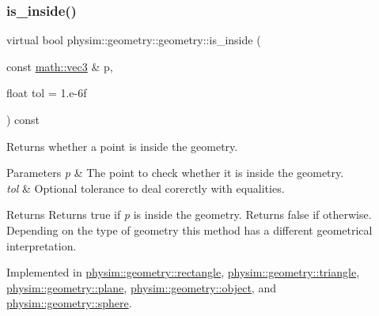 \mbox{\label{classphysim_1_1geometry_1_1geometry_a8ae67bba78a06e3c41b7f5b5903b897d}} 
\subsubsection{\texorpdfstring{is\+\_\+inside()}{is\_inside()}}
{\footnotesize\ttfamily virtual bool physim\+::geometry\+::geometry\+::is\+\_\+inside (\begin{DoxyParamCaption}\item[{const \hyperlink{structphysim_1_1math_1_1vec3}{math\+::vec3} \&}]{p,  }\item[{float}]{tol = {\ttfamily 1.e-\/6f} }\end{DoxyParamCaption}) const\hspace{0.3cm}{\ttfamily [pure virtual]}}



Returns whether a point is inside the geometry. 


\begin{DoxyParams}{Parameters}
{\em p} & The point to check whether it is inside the geometry. \\
\hline
{\em tol} & Optional tolerance to deal corerctly with equalities. \\
\hline
\end{DoxyParams}
\begin{DoxyReturn}{Returns}
Returns true if {\itshape p} is inside the geometry. Returns false if otherwise. Depending on the type of geometry this method has a different geometrical interpretation. 
\end{DoxyReturn}


Implemented in \hyperlink{classphysim_1_1geometry_1_1rectangle_ab3e8fe39d7d8fa8139bae3f84b41127c}{physim\+::geometry\+::rectangle}, \hyperlink{classphysim_1_1geometry_1_1triangle_aa63eb64a152db96607423c9c30e5dd01}{physim\+::geometry\+::triangle}, \hyperlink{classphysim_1_1geometry_1_1plane_ad5e112588680a3668cc8b93e9c880d9a}{physim\+::geometry\+::plane}, \hyperlink{classphysim_1_1geometry_1_1object_a93f6efc676b892f47b40434c152c610f}{physim\+::geometry\+::object}, and \hyperlink{classphysim_1_1geometry_1_1sphere_a2858bd8fa9a68d660cec947917e6720c}{physim\+::geometry\+::sphere}.

\mbox{\label{classphysim_1_1geometry_1_1geometry_a45bffd27f5e8d59375762cf7987625e1}} 
